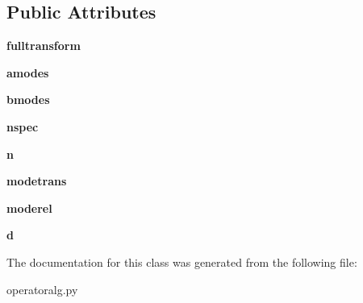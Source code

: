 \subsection*{Public Attributes}
\begin{DoxyCompactItemize}
\item 
\mbox{\label{classoperatoralg_1_1Operatoralg_a82d4932642edf63c7880de684b74d351}} 
{\bfseries fulltransform}
\item 
\mbox{\label{classoperatoralg_1_1Operatoralg_aacae64fabc1634fa0cd2ebaaa2e555ab}} 
{\bfseries amodes}
\item 
\mbox{\label{classoperatoralg_1_1Operatoralg_a0b34db4b61ad04635cb5bc3abcb7fd23}} 
{\bfseries bmodes}
\item 
\mbox{\label{classoperatoralg_1_1Operatoralg_ad6c5548ca9c7bb997f55b92d07b51ca9}} 
{\bfseries nspec}
\item 
\mbox{\label{classoperatoralg_1_1Operatoralg_a5a82ace8497001b9630863fc116ee363}} 
{\bfseries n}
\item 
\mbox{\label{classoperatoralg_1_1Operatoralg_a5a34387de35e84bb2faed7f3aaad7539}} 
{\bfseries modetrans}
\item 
\mbox{\label{classoperatoralg_1_1Operatoralg_af29b900c7e2d886ea089bfafd4854fbf}} 
{\bfseries moderel}
\item 
\mbox{\label{classoperatoralg_1_1Operatoralg_a469322cbb81cc079c553bf1436d79d3d}} 
{\bfseries d}
\end{DoxyCompactItemize}


The documentation for this class was generated from the following file\+:\begin{DoxyCompactItemize}
\item 
operatoralg.\+py\end{DoxyCompactItemize}
